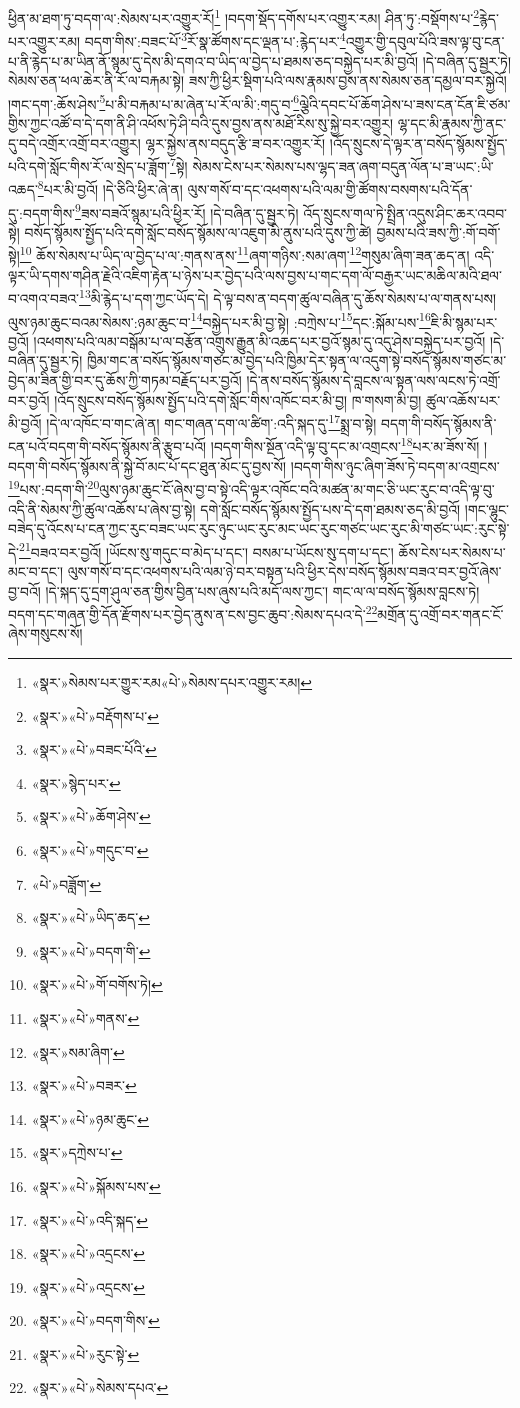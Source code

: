 ཕྱིན་མ་ཐག་ཏུ་བདག་ལ་:སེམས་པར་འགྱུར་རོ།\footnote{«སྣར་»སེམས་པར་གྱུར་རམ«པེ་»སེམས་དཔར་འགྱུར་རམ།} །བདག་སྡོད་དགོས་པར་འགྱུར་རམ། ཤིན་ཏུ་:བསྡོགས་པ་\footnote{«སྣར་»«པེ་»བརྡོགས་པ་}རྙེད་པར་འགྱུར་རམ། བདག་གིས་:བཟང་པོ་\footnote{«སྣར་»«པེ་»བཟང་པོའི་}རོ་སྣ་ཚོགས་དང་ལྡན་པ་:རྙེད་པར་\footnote{«སྣར་»སྙེད་པར་}འགྱུར་གྱི་དབུལ་པོའི་ཟས་ལྟ་བུ་ངན་པ་ནི་རྙེད་པ་མ་ཡིན་ནོ་སྙམ་དུ་དེས་མི་དགའ་བ་ཡིད་ལ་བྱེད་པ་ཐམས་ཅད་བསྐྱེད་པར་མི་བྱའོ། །དེ་བཞིན་དུ་སྦྱར་ཏེ། སེམས་ཅན་ཕལ་ཆེར་ནི་རོ་ལ་བརྐམ་སྟེ། ཟས་ཀྱི་ཕྱིར་སྡིག་པའི་ལས་རྣམས་བྱས་ནས་སེམས་ཅན་དམྱལ་བར་སྐྱེའོ། །གང་དག་:ཆོས་ཤེས་\footnote{«སྣར་»«པེ་»ཆོག་ཤེས་}པ་མི་བརྐམ་པ་མ་ཞེན་པ་རོ་ལ་མི་:གདུ་བ་\footnote{«སྣར་»«པེ་»གདུང་བ་}ལྕེའི་དབང་པོ་ཆོག་ཤེས་པ་ཟས་ངན་ངོན་ཇི་ཙམ་གྱིས་ཀྱང་འཚོ་བ་དེ་དག་ནི་ཤི་འཕོས་ཏེ་ཤི་བའི་དུས་བྱས་ནས་མཐོ་རིས་སུ་སྐྱེ་བར་འགྱུར། ལྷ་དང་མི་རྣམས་ཀྱི་ནང་དུ་བདེ་འགྲོར་འགྲོ་བར་འགྱུར། ལྷར་སྐྱེས་ནས་བདུད་རྩི་ཟ་བར་འགྱུར་རོ། །འོད་སྲུངས་དེ་ལྟར་ན་བསོད་སྙོམས་སྤྱོད་པའི་དགེ་སློང་གིས་རོ་ལ་སྲེད་པ་ཟློག་\footnote{«པེ་»བཟློག་}སྟེ། སེམས་ངེས་པར་སེམས་པས་ལྷད་ཟན་ཞག་བདུན་ལོན་པ་ཟ་ཡང་:ཡི་འཆད་\footnote{«སྣར་»«པེ་»ཡིད་ཆད་}པར་མི་བྱའོ། །དེ་ཅིའི་ཕྱིར་ཞེ་ན། ལུས་གསོ་བ་དང་འཕགས་པའི་ལམ་གྱི་ཚོགས་བསགས་པའི་དོན་དུ་:བདག་གིས་\footnote{«སྣར་»«པེ་»བདག་གི་}ཟས་བཟའོ་སྙམ་པའི་ཕྱིར་རོ། །དེ་བཞིན་དུ་སྦྱར་ཏེ། འོད་སྲུངས་གལ་ཏེ་སྤྲིན་འདུས་ཤིང་ཆར་འབབ་སྟེ། བསོད་སྙོམས་སྤྱོད་པའི་དགེ་སློང་བསོད་སྙོམས་ལ་འཇུག་མི་ནུས་པའི་དུས་ཀྱི་ཚེ། བྱམས་པའི་ཟས་ཀྱི་:གོ་བགོ་སྟེ།\footnote{«སྣར་»«པེ་»གོ་བགོས་ཏེ།} ཆོས་སེམས་པ་ཡིད་ལ་བྱེད་པ་ལ་:གནས་ནས་\footnote{«སྣར་»«པེ་»གནས་}ཞག་གཉིས་:སམ་ཞག་\footnote{«སྣར་»སམ་ཞིག་}གསུམ་ཞིག་ཟན་ཆད་ན། འདི་ལྟར་ཡི་དགས་གཤིན་རྗེའི་འཇིག་རྟེན་པ་ཉེས་པར་བྱེད་པའི་ལས་བྱས་པ་གང་དག་ལོ་བརྒྱར་ཡང་མཆིལ་མའི་ཐལ་བ་འགའ་བཟའ་\footnote{«སྣར་»«པེ་»བཟར་}མི་རྙེད་པ་དག་ཀྱང་ཡོད་དེ། དེ་ལྟ་བས་ན་བདག་ཚུལ་བཞིན་དུ་ཆོས་སེམས་པ་ལ་གནས་པས། ལུས་ཉམ་ཆུང་བའམ་སེམས་:ཉམ་ཆུང་བ་\footnote{«སྣར་»«པེ་»ཉམ་ཆུང་}བསྐྱེད་པར་མི་བྱ་སྟེ། :བཀྲེས་པ་\footnote{«སྣར་»དཀྲེས་པ་}དང་:སྐོམ་པས་\footnote{«སྣར་»«པེ་»སྐོམས་པས་}ཇི་མི་སྙམ་པར་བྱའོ། །འཕགས་པའི་ལམ་བསྒོམ་པ་ལ་བརྩོན་འགྲུས་རྒྱུན་མི་འཆད་པར་བྱའོ་སྙམ་དུ་འདུ་ཤེས་བསྐྱེད་པར་བྱའོ། །དེ་བཞིན་དུ་སྦྱར་ཏེ། ཁྱིམ་གང་ན་བསོད་སྙོམས་གཙང་མ་བྱེད་པའི་ཁྱིམ་དེར་སྟན་ལ་འདུག་སྟེ་བསོད་སྙོམས་གཙང་མ་བྱེད་མ་ཟིན་གྱི་བར་དུ་ཆོས་ཀྱི་གཏམ་བརྗོད་པར་བྱའོ། །དེ་ནས་བསོད་སྙོམས་དེ་བླངས་ལ་སྟན་ལས་ལངས་ཏེ་འགྲོ་བར་བྱའོ། །འོད་སྲུངས་བསོད་སྙོམས་སྤྱོད་པའི་དགེ་སློང་གིས་འཁོང་བར་མི་བྱ། ཁ་གསག་མི་བྱ། ཚུལ་འཆོས་པར་མི་བྱའོ། །དེ་ལ་འཁོང་བ་གང་ཞེ་ན། གང་གཞན་དག་ལ་ཚིག་:འདི་སྐད་དུ་\footnote{«སྣར་»«པེ་»འདི་སྐད་}སྨྲ་བ་སྟེ། བདག་གི་བསོད་སྙོམས་ནི་ངན་པའོ་བདག་གི་བསོད་སྙོམས་ནི་རྩུབ་པའོ། །བདག་གིས་སྔོན་འདི་ལྟ་བུ་དང་མ་འགྲངས་\footnote{«སྣར་»«པེ་»འདྲངས་}པར་མ་ཟོས་སོ། །བདག་གི་བསོད་སྙོམས་ནི་སྐྱེ་བོ་མང་པོ་དང་ཐུན་མོང་དུ་བྱས་སོ། །བདག་གིས་ཉུང་ཞིག་ཟོས་ཏེ་བདག་མ་འགྲངས་\footnote{«སྣར་»«པེ་»འདྲངས་}པས་:བདག་གི་\footnote{«སྣར་»«པེ་»བདག་གིས་}ལུས་ཉམ་ཆུང་ངོ་ཞེས་བྱ་བ་སྟེ་འདི་ལྟར་འཁོང་བའི་མཚན་མ་གང་ཅི་ཡང་རུང་བ་འདི་ལྟ་བུ་འདི་ནི་སེམས་ཀྱི་ཚུལ་འཆོས་པ་ཞེས་བྱ་སྟེ། དགེ་སློང་བསོད་སྙོམས་སྤྱོད་པས་དེ་དག་ཐམས་ཅད་མི་བྱའོ། །གང་ལྷུང་བཟེད་དུ་འོངས་པ་ངན་ཀྱང་རུང་བཟང་ཡང་རུང་ཉུང་ཡང་རུང་མང་ཡང་རུང་གཙང་ཡང་རུང་མི་གཙང་ཡང་:རུང་སྟེ་དེ་\footnote{«སྣར་»«པེ་»རུང་སྟེ་}བཟའ་བར་བྱའོ། །ཡོངས་སུ་གདུང་བ་མེད་པ་དང་། བསམ་པ་ཡོངས་སུ་དག་པ་དང་། ཆོས་ངེས་པར་སེམས་པ་མང་བ་དང་། ལུས་གསོ་བ་དང་འཕགས་པའི་ལམ་ཉེ་བར་བསྟན་པའི་ཕྱིར་དེས་བསོད་སྙོམས་བཟའ་བར་བྱའོ་ཞེས་བྱ་བའོ། །དེ་སྐད་དུ་དྲག་ཤུལ་ཅན་གྱིས་བྱིན་པས་ཞུས་པའི་མདོ་ལས་ཀྱང་། གང་ལ་ལ་བསོད་སྙོམས་བླངས་ཏེ། བདག་དང་གཞན་གྱི་དོན་རྫོགས་པར་བྱེད་ནུས་ན་ངས་བྱང་ཆུབ་:སེམས་དཔའ་དེ་\footnote{«སྣར་»«པེ་»སེམས་དཔའ་}མགྲོན་དུ་འགྲོ་བར་གནང་ངོ་ཞེས་གསུངས་སོ། 